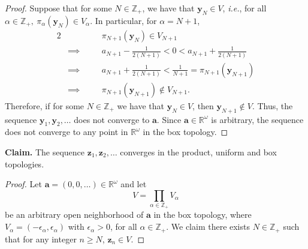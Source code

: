 \documentclass[a4paper,10pt]{article}
\newcommand{\by}{\mathbf{y}}
\newcommand{\bz}{\mathbf{z}}
\newcommand{\ZZ}{\mathbb{Z}}
\newcommand{\RR}{\mathbb{R}}
\begin{document}
\begin{solution}
\begin{proof}
        Suppose that for some $N \in \ZZ_+$, we have that $\by_N \in V$, \textit{i.e.}, for all $\alpha \in \ZZ_+,~ \pi_\alpha(\by_N) \in V_\alpha$.
        In particular, for $\alpha = N+1$,
        \begin{alignat*}{2}
            &           && \quad \pi_{N+1}(\by_N) \in V_{N+1} \\
            & \implies  && \quad a_{N+1} - \tfrac{1}{2(N+1)} < 0 < a_{N+1} + \tfrac{1}{2(N+1)} \\
            & \implies  && \quad a_{N+1} + \tfrac{1}{2(N+1)} < \tfrac{1}{N + 1} = \pi_{N+1}(\by_{N+1}) \\
            & \implies  && \quad \pi_{N+1}(\by_{N+1}) \not\in V_{N+1}.
        \end{alignat*}
        Therefore, if for some $N \in \ZZ_+$ we have that $\by_N \in V$, then $\by_{N+1} \not\in V$.
        Thus, the sequence $\by_1, \by_2, \ldots$ does not converge to $\mathbf{a}$.
        Since $\mathbf{a} \in \RR^\omega$ is arbitrary, the sequence does not converge to any point in $\RR^\omega$ in the box topology.
    \end{proof}
    \bigskip

    \textbf{Claim.} The sequence $\bz_1, \bz_2, \ldots$ converges in the product, uniform and box topologies.
    \begin{proof}
        Let $\mathbf{a} = (0, 0, \ldots) \in \RR^\omega$ and let
        \begin{equation*}
            V = \prod_{\alpha\in\ZZ_+} V_\alpha
        \end{equation*}
        be an arbitrary open neighborhood of $\mathbf{a}$ in the box topology, where $V_\alpha = (-\epsilon_\alpha, \epsilon_\alpha)$ with $\epsilon_\alpha > 0$, for all $\alpha \in \ZZ_+$.
        We claim there exists $N \in \ZZ_+$ such that for any integer $n \geq N$, $\bz_n \in V$.


\end{proof}
\end{solution}
\end{document}
